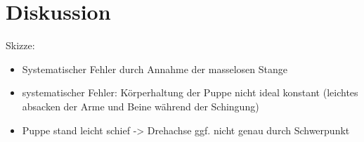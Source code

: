 \section{Diskussion}
\label{sec:Diskussion}

Skizze:
\begin{itemize}
  \item Systematischer Fehler durch Annahme der masselosen Stange
  \item systematischer Fehler: Körperhaltung der Puppe nicht ideal konstant (leichtes
  absacken der Arme und Beine während der Schingung)
  \item Puppe stand leicht schief -> Drehachse ggf. nicht genau durch Schwerpunkt

\end{itemize}
